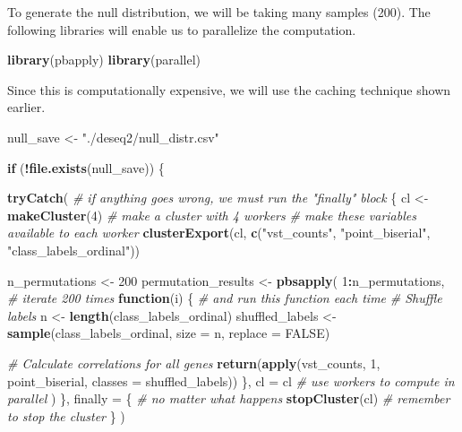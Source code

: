 \documentclass[
]{book}
\newenvironment{Shaded}{\begin{snugshade}}{\end{snugshade}}
\newcommand{\AttributeTok}[1]{\textcolor[rgb]{0.13,0.29,0.53}{#1}}
\newcommand{\CommentTok}[1]{\textcolor[rgb]{0.56,0.35,0.01}{\textit{#1}}}
\newcommand{\ConstantTok}[1]{\textcolor[rgb]{0.56,0.35,0.01}{#1}}
\newcommand{\ControlFlowTok}[1]{\textcolor[rgb]{0.13,0.29,0.53}{\textbf{#1}}}
\newcommand{\DecValTok}[1]{\textcolor[rgb]{0.00,0.00,0.81}{#1}}
\newcommand{\FunctionTok}[1]{\textcolor[rgb]{0.13,0.29,0.53}{\textbf{#1}}}
\newcommand{\NormalTok}[1]{#1}
\newcommand{\OtherTok}[1]{\textcolor[rgb]{0.56,0.35,0.01}{#1}}
\newcommand{\SpecialCharTok}[1]{\textcolor[rgb]{0.81,0.36,0.00}{\textbf{#1}}}
\newcommand{\StringTok}[1]{\textcolor[rgb]{0.31,0.60,0.02}{#1}}
\begin{document}
To generate the null distribution, we will be taking many samples (200). The following libraries will enable us to parallelize the computation.

\begin{Shaded}
\begin{Highlighting}[numbers=left,,]
\FunctionTok{library}\NormalTok{(pbapply)}
\FunctionTok{library}\NormalTok{(parallel)}
\end{Highlighting}
\end{Shaded}

Since this is computationally expensive, we will use the caching technique shown earlier.

\begin{Shaded}
\begin{Highlighting}[numbers=left,,]
\NormalTok{null\_save }\OtherTok{\textless{}{-}} \StringTok{"./deseq2/null\_distr.csv"}

\ControlFlowTok{if}\NormalTok{ (}\SpecialCharTok{!}\FunctionTok{file.exists}\NormalTok{(null\_save)) \{}

  \FunctionTok{tryCatch}\NormalTok{(             }\CommentTok{\# if anything goes wrong, we must run the "finally" block}
\NormalTok{    \{}
\NormalTok{      cl }\OtherTok{\textless{}{-}} \FunctionTok{makeCluster}\NormalTok{(}\DecValTok{4}\NormalTok{) }\CommentTok{\# make a cluster with 4 workers}
      \CommentTok{\# make these variables available to each worker}
      \FunctionTok{clusterExport}\NormalTok{(cl, }\FunctionTok{c}\NormalTok{(}\StringTok{"vst\_counts"}\NormalTok{, }\StringTok{"point\_biserial"}\NormalTok{, }\StringTok{"class\_labels\_ordinal"}\NormalTok{))}

\NormalTok{      n\_permutations }\OtherTok{\textless{}{-}} \DecValTok{200}
\NormalTok{      permutation\_results }\OtherTok{\textless{}{-}} \FunctionTok{pbsapply}\NormalTok{(}
        \DecValTok{1}\SpecialCharTok{:}\NormalTok{n\_permutations,   }\CommentTok{\# iterate 200 times}
        \ControlFlowTok{function}\NormalTok{(i) \{       }\CommentTok{\# and run this function each time}
          \CommentTok{\# Shuffle labels}
\NormalTok{          n }\OtherTok{\textless{}{-}} \FunctionTok{length}\NormalTok{(class\_labels\_ordinal)}
\NormalTok{          shuffled\_labels }\OtherTok{\textless{}{-}} \FunctionTok{sample}\NormalTok{(class\_labels\_ordinal, }\AttributeTok{size =}\NormalTok{ n, }\AttributeTok{replace =} \ConstantTok{FALSE}\NormalTok{)}

          \CommentTok{\# Calculate correlations for all genes}
          \FunctionTok{return}\NormalTok{(}\FunctionTok{apply}\NormalTok{(vst\_counts, }\DecValTok{1}\NormalTok{, point\_biserial, }\AttributeTok{classes =}\NormalTok{ shuffled\_labels))}
\NormalTok{        \},}
        \AttributeTok{cl =}\NormalTok{ cl }\CommentTok{\# use workers to compute in parallel}
\NormalTok{      )}
\NormalTok{    \},}
    \AttributeTok{finally =}\NormalTok{ \{         }\CommentTok{\# no matter what happens}
      \FunctionTok{stopCluster}\NormalTok{(cl)   }\CommentTok{\# remember to stop the cluster}
\NormalTok{    \}}
\NormalTok{  )}


\end{Highlighting}
\end{Shaded}
\end{document}
